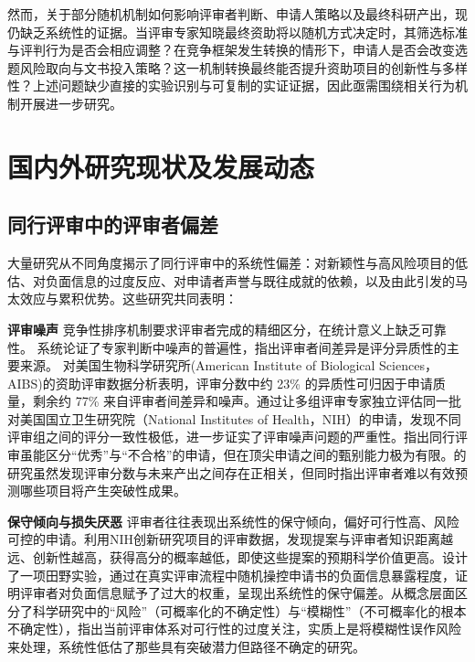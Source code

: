 然而，关于部分随机机制如何影响评审者判断、申请人策略以及最终科研产出，现仍缺乏系统性的证据。当评审专家知晓最终资助将以随机方式决定时，其筛选标准与评判行为是否会相应调整？在竞争框架发生转换的情形下，申请人是否会改变选题风险取向与文书投入策略？这一机制转换最终能否提升资助项目的创新性与多样性？上述问题缺少直接的实验识别与可复制的实证证据，因此亟需围绕相关行为机制开展进一步研究。

\section{\textbf{国内外研究现状及发展动态}}

\subsection{\textbf{同行评审中的评审者偏差}}

大量研究从不同角度揭示了同行评审中的系统性偏差：对新颖性与高风险项目的低估、对负面信息的过度反应、对申请者声誉与既往成就的依赖，以及由此引发的马太效应与累积优势。这些研究共同表明：

\textbf{评审噪声} \quad 竞争性排序机制要求评审者完成的精细区分，在统计意义上缺乏可靠性。 \cite{kahnemanNoiseFlawHuman2021} 系统论证了专家判断中噪声的普遍性，指出评审者间差异是评分异质性的主要来源。 \cite{galloInfluencePeerReviewer2016}对美国生物科学研究所(American Institute of Biological Sciences，AIBS)的资助评审数据分析表明，评审分数中约 23\% 的异质性可归因于申请质量，剩余约 77\% 来自评审者间差异和噪声。\cite{pierLowAgreementReviewers2018}通过让多组评审专家独立评估同一批对美国国立卫生研究院（National Institutes of Health，NIH）的申请，发现不同评审组之间的评分一致性极低，进一步证实了评审噪声问题的严重性。\cite{schweigerCostsCompetitionDistributing2024}指出同行评审虽能区分“优秀”与“不合格”的申请，但在顶尖申请之间的甄别能力极为有限。\cite{liBigNamesBig2015}的研究虽然发现评审分数与未来产出之间存在正相关，但同时指出评审者难以有效预测哪些项目将产生突破性成果。

\textbf{保守倾向与损失厌恶} \quad 评审者往往表现出系统性的保守倾向，偏好可行性高、风险可控的申请。\cite{boudreauLookingLookingKnowledge2016}利用NIH创新研究项目的评审数据，发现提案与评审者知识距离越远、创新性越高，获得高分的概率越低，即使这些提案的预期科学价值更高。\cite{laneConservatismGetsFunded2022}设计了一项田野实验，通过在真实评审流程中随机操控申请书的负面信息暴露程度，证明评审者对负面信息赋予了过大的权重，呈现出系统性的保守偏差。\cite{franzoniUncertaintyRisktakingScience2023}从概念层面区分了科学研究中的“风险”（可概率化的不确定性）与“模糊性”（不可概率化的根本不确定性），指出当前评审体系对可行性的过度关注，实质上是将模糊性误作风险来处理，系统性低估了那些具有突破潜力但路径不确定的研究。

